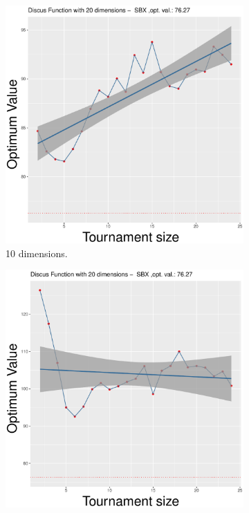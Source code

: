 \begin{figure}[t]
	\begin{subfigure}[b]{0.33\textwidth}
		\centering
		\includegraphics[width=\textwidth]{img/SBX-10D/unimodal_sbx_11_dim_10.pdf}
		\caption{10 dimensions.}
	\end{subfigure}
	\begin{subfigure}[b]{0.33\textwidth}
		\centering
		\includegraphics[width=\textwidth]{img/SBX-20D/unimodal_sbx_11_dim_20.pdf}

\end{subfigure}
\end{figure}
